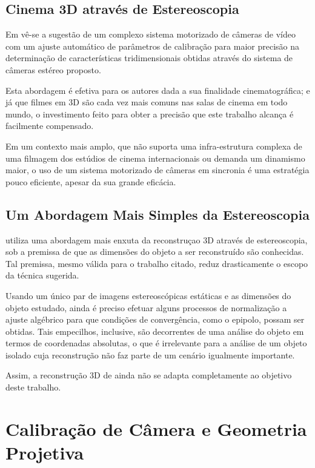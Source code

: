 		\subsection{Cinema 3D através de Estereoscopia}
		
		Em \cite{disneyRelatedWork} vê-se a sugestão de um complexo sistema motorizado de câmeras de vídeo com um ajuste automático de parâmetros de calibração para maior precisão na determinação de características tridimensionais obtidas através do sistema de câmeras estéreo proposto.
		
		Esta abordagem é efetiva para os autores dada a sua finalidade cinematográfica; e já que filmes em 3D são cada vez mais comuns nas salas de cinema em todo mundo, o investimento feito para obter a precisão que este trabalho alcança é facilmente compensado.
		
		Em um contexto mais amplo, que não suporta uma infra-estrutura complexa de uma filmagem dos estúdios de cinema internacionais ou demanda um dinamismo maior, o uso de um sistema motorizado de câmeras em sincronia é uma estratégia pouco eficiente, apesar da sua grande eficácia.
		
		\subsection{Um Abordagem Mais Simples da Estereoscopia}
		
		\cite{stereoRelatedWork} utiliza uma abordagem mais enxuta da reconstruçao 3D através de estereoscopia, sob a premissa de que as dimensões do objeto a ser reconstruído são conhecidas. Tal premissa, mesmo válida para o trabalho citado, reduz drasticamente o escopo da técnica sugerida.
		
		Usando um único par de imagens estereoscópicas estáticas e as dimensões do objeto estudado, ainda é preciso efetuar alguns processos de normalização a ajuste algébrico para que condições de convergência, como o epipolo, possam ser obtidas. Tais empecilhos, inclusive, são decorrentes de uma análise do objeto em termos de coordenadas absolutas, o que é irrelevante para a análise de um objeto isolado cuja reconstrução não faz parte de um cenário igualmente importante.
		
		Assim, a reconstrução 3D de \cite{stereoRelatedWork} ainda não se adapta completamente ao objetivo deste trabalho.
		
	\section{Calibração de Câmera e Geometria Projetiva}
		\label{secaoEstadoDaArteCalibracao}
	
